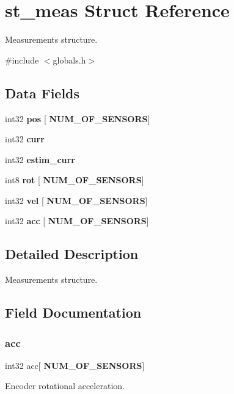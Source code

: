 \section{st\+\_\+meas Struct Reference}
\label{structst__meas}


Measurements structure.  




{\ttfamily \#include $<$globals.\+h$>$}

\subsection*{Data Fields}
\begin{DoxyCompactItemize}
\item 
int32 \textbf{ pos} [\textbf{ N\+U\+M\+\_\+\+O\+F\+\_\+\+S\+E\+N\+S\+O\+RS}]
\item 
int32 \textbf{ curr}
\item 
int32 \textbf{ estim\+\_\+curr}
\item 
int8 \textbf{ rot} [\textbf{ N\+U\+M\+\_\+\+O\+F\+\_\+\+S\+E\+N\+S\+O\+RS}]
\item 
int32 \textbf{ vel} [\textbf{ N\+U\+M\+\_\+\+O\+F\+\_\+\+S\+E\+N\+S\+O\+RS}]
\item 
int32 \textbf{ acc} [\textbf{ N\+U\+M\+\_\+\+O\+F\+\_\+\+S\+E\+N\+S\+O\+RS}]
\end{DoxyCompactItemize}


\subsection{Detailed Description}
Measurements structure. 



\subsection{Field Documentation}
\mbox{\label{structst__meas_a382cdae8f034ef5627c27a46e2f00a72}} 
\subsubsection{acc}
{\footnotesize\ttfamily int32 acc[\textbf{ N\+U\+M\+\_\+\+O\+F\+\_\+\+S\+E\+N\+S\+O\+RS}]}

Encoder rotational acceleration. \mbox{\label{structst__meas_adfe6e2bdca09ed7177204234bc2a6d26}} 
